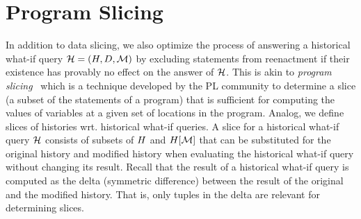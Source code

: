 \section{Program Slicing}
\label{sec:dep-ana}


In addition to data slicing,
we also optimize the process of answering a historical what-if query $\mathcal{H} = (H, D, \mathcal{M})$
by excluding statements from reenactment if their existence has provably no effect on the answer of $\mathcal{H}$. This is akin to \textit{program slicing}~\cite{cheney07,W81} which is a technique developed by the PL community to determine a slice (a subset of the statements of a program) that is sufficient for computing the values of variables at a given set of locations in the program.
Analog, we define slices of histories wrt. historical what-if queries.
A slice for a historical what-if query $\mathcal{H}$ consists of subsets of $H$ and $H[\mathcal{M}]$ that can be substituted for the original history and modified history when evaluating the historical what-if query without changing its result. Recall that the result of a historical what-if query is computed as the delta (symmetric difference) between the result of the original and the modified history. That is, only tuples in the delta are relevant for determining slices.

